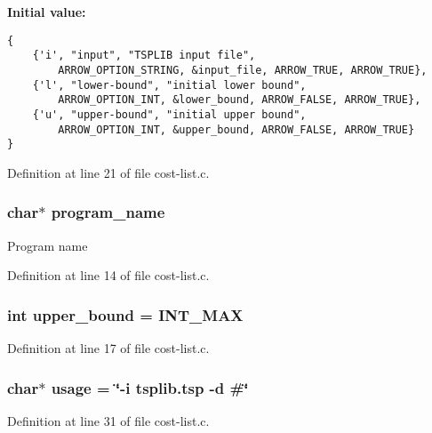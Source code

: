 \textbf{Initial value:}

\begin{Code}\begin{verbatim}
{
    {'i', "input", "TSPLIB input file", 
        ARROW_OPTION_STRING, &input_file, ARROW_TRUE, ARROW_TRUE},
    {'l', "lower-bound", "initial lower bound",
        ARROW_OPTION_INT, &lower_bound, ARROW_FALSE, ARROW_TRUE},
    {'u', "upper-bound", "initial upper bound",
        ARROW_OPTION_INT, &upper_bound, ARROW_FALSE, ARROW_TRUE}
}
\end{verbatim}
\end{Code}


Definition at line 21 of file cost-list.c.\hypertarget{cost-list_8c_289c5900d90626d909f0a85d5a0ed61d}{
\subsubsection[{program\_\-name}]{\setlength{\rightskip}{0pt plus 5cm}char$\ast$ {\bf program\_\-name}}}
\label{cost-list_8c_289c5900d90626d909f0a85d5a0ed61d}


Program name 

Definition at line 14 of file cost-list.c.\hypertarget{cost-list_8c_f5a34eb1d01ffd792adcadc9627ffcb8}{
\subsubsection[{upper\_\-bound}]{\setlength{\rightskip}{0pt plus 5cm}int {\bf upper\_\-bound} = INT\_\-MAX}}
\label{cost-list_8c_f5a34eb1d01ffd792adcadc9627ffcb8}




Definition at line 17 of file cost-list.c.\hypertarget{cost-list_8c_adebe2487a2c5240ab6cd02c83add0bf}{
\subsubsection[{usage}]{\setlength{\rightskip}{0pt plus 5cm}char$\ast$ {\bf usage} = \char`\"{}-i tsplib.tsp -d \#\char`\"{}}}
\label{cost-list_8c_adebe2487a2c5240ab6cd02c83add0bf}




Definition at line 31 of file cost-list.c.